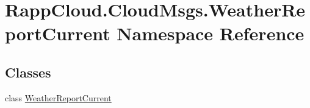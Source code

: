 \hypertarget{namespaceRappCloud_1_1CloudMsgs_1_1WeatherReportCurrent}{\section{Rapp\-Cloud.\-Cloud\-Msgs.\-Weather\-Report\-Current Namespace Reference}
\label{namespaceRappCloud_1_1CloudMsgs_1_1WeatherReportCurrent}
}
\subsection*{Classes}
\begin{DoxyCompactItemize}
\item 
class \hyperlink{classRappCloud_1_1CloudMsgs_1_1WeatherReportCurrent_1_1WeatherReportCurrent}{Weather\-Report\-Current}
\end{DoxyCompactItemize}
